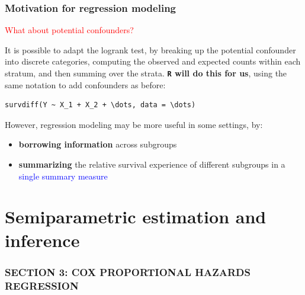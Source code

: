 \documentclass[12pt, 
hyperref={colorlinks=true, linkcolor=blue, urlcolor=cyan},dvipsnames]{beamer}
\begin{document}
\begin{frame}[fragile]
\frametitle{Motivation for regression modeling}

\textcolor{red}{What about potential confounders?} \pause

It is \textcolor{BurntOrange}{possible} to adapt the logrank test, by breaking up the potential confounder into discrete categories, computing the observed and expected counts within each stratum, and then summing over the strata. \textbf{\texttt{R} will do this for us}, using the same notation to add confounders as before:\vspace{-0.3cm} 
\begin{verbatim}
survdiff(Y ~ X_1 + X_2 + \dots, data = \dots)
\end{verbatim}\vspace{-0.5cm}

However, regression modeling may be more useful in some settings, by: \vspace{-0.3cm}
\begin{itemize}
\item \textbf{borrowing information} across subgroups
\item \textbf{summarizing} the relative survival experience of different subgroups in a \textcolor{blue}{single summary measure}
\end{itemize}
\end{frame}

\section{Semiparametric estimation and inference}
\begin{frame}
\frametitle{SECTION 3: COX PROPORTIONAL HAZARDS REGRESSION}

\end{frame}

\end{document}
